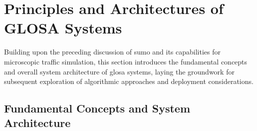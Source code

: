 \section{Principles and Architectures of GLOSA Systems}
\label{sec:glosa}

Building upon the preceding discussion of \ac{sumo} and its capabilities for microscopic traffic simulation, this section introduces the fundamental concepts and overall system architecture of \ac{glosa} systems, laying the groundwork for subsequent exploration of algorithmic approaches and deployment considerations.

\subsection{Fundamental Concepts and System Architecture}
\label{subsec:glosa_concepts_architecture}

